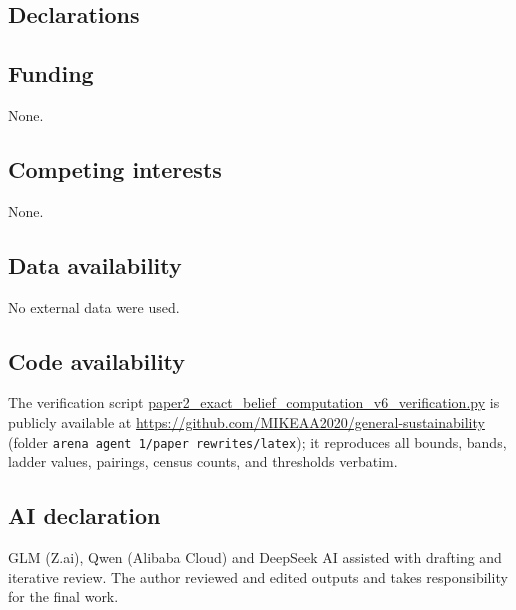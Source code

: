 \documentclass[10pt,twocolumn]{article}
\theoremstyle{plain}
\theoremstyle{definition}
\theoremstyle{remark}
\begin{document}
\subsection*{Declarations}

\subsection*{Funding}
None.

\subsection*{Competing interests}
None.

\subsection*{Data availability}
No external data were used.

\subsection*{Code availability}
The verification script
\url{paper2_exact_belief_computation_v6_verification.py} is publicly
available at \url{https://github.com/MIKEAA2020/general-sustainability}
(folder \texttt{arena agent 1/paper rewrites/latex}); it reproduces all bounds, bands, ladder values, pairings,
census counts, and thresholds verbatim.

\subsection*{AI declaration}
GLM (Z.ai), Qwen (Alibaba Cloud) and DeepSeek AI assisted with drafting
and iterative review. The author reviewed and edited outputs and takes
responsibility for the final work.
\end{document}
